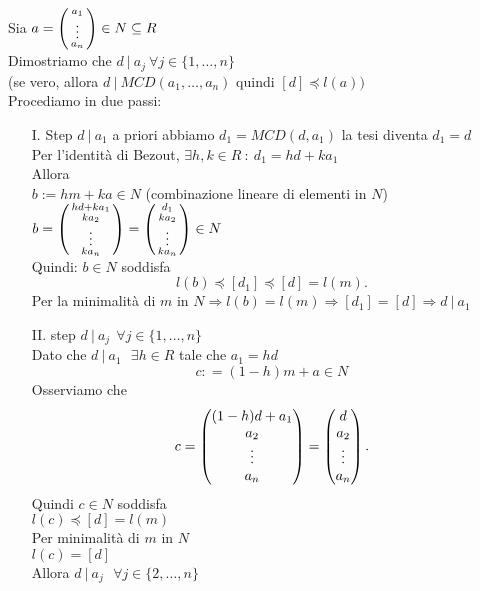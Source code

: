 \documentclass[12px]{article}
\begin{document}
\begin{dimo}
	Sia $a  = \left(\begin{smallmatrix}a_1\\\vdots\\a_n\end{smallmatrix}\right)\in N\subseteq R$\\
	Dimostriamo che $d \ |\  a_j \ \forall j\in \{1,\ldots,n\}$\\ (se vero, allora  $d \ | \ MCD(a_1,\ldots, a_n)$ quindi $[d]\preceq l(a))$ \\
	Procediamo in due passi:
	\begin{enumerate}
		\item[I. Step] $d \ | \ a_1$ a priori abbiamo $d_1 = MCD(d,a_1)$ la tesi diventa $d_1=d$ \\
			Per l'identità di Bezout, $\exists h,k\in R\ : \ d_1 = hd + ka_1$\\
			Allora \\
		$b:= hm + ka \in N$ (combinazione lineare di elementi in $N$)\\
		$b = \left(\begin{smallmatrix}hd + ka_1\\ka_2\\\vdots\\ka_n\end{smallmatrix}\right) = \left(\begin{smallmatrix}d_1\\ka_2\\\vdots\\ka_n\end{smallmatrix}\right)\in N$\\
		Quindi: $b\in N$ soddisfa\\
		\[
			l(b)  \preceq [d_1]\preceq [d] = l(m)
		.\] 
		Per la minimalità di $m$ in $N \Rightarrow  l(b) = l(m) \Rightarrow  [d_1] = [d] \Rightarrow  d \ | \ a_1$ 
	\item[II. step]  $d \ | \ a_j \ \ \forall j\in \{1,\ldots,n\}$\\
		Dato che  $d\ | \ a_1\ \ \ \exists h\in R$ tale che $a_1 = hd $\\
	\[c: = (1-h)m + a\in N\]
		Osserviamo che 
		\[
			c = \begin{pmatrix}(1-h)d + a_1\\a_2\\\vdots\\ a_n\end{pmatrix} = \begin{pmatrix}d\\a_2\\\vdots\\a_n\end{pmatrix}
		.\] 
		Quindi $c\in N$ soddisfa\\
		$l(c)\preceq [d] = l(m)$\\
		Per minimalità di $m$ in  $N$\\
		$l(c) = [d]$\\
		Allora  $d \ | \ a_j\ \ \ \forall j\in\{2,\ldots,n\}$
	\end{enumerate}
\end{dimo}
\end{document}
